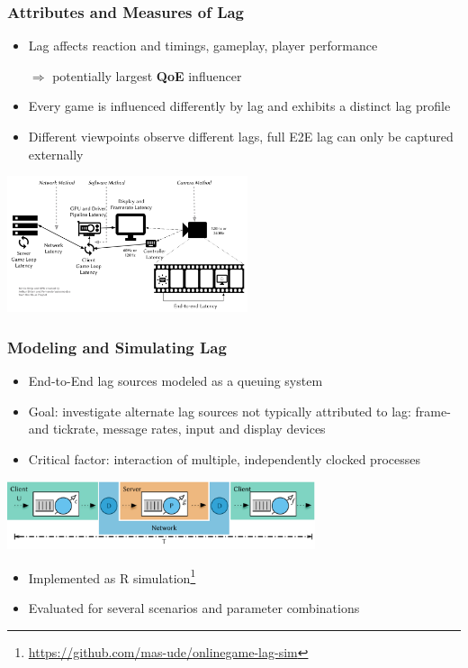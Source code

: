 \documentclass{UDEbeamerEN}
\begin{document}
\begin{frame}
	\frametitle{Attributes and Measures of Lag}

	\begin{itemize}
		\item Lag affects reaction and timings, gameplay, player performance 
		\item[$\Rightarrow$] potentially largest \textbf{QoE} influencer
		\item Every game is influenced differently by lag and exhibits a distinct lag profile
		\item Different viewpoints observe different lags, full E2E lag can only be captured externally
	\end{itemize}

	\begin{center}
		\vspace{-2mm}

		\includegraphics[height=4cm]{../../../models/e2e-lag.pdf}
	\end{center}

\end{frame}


\begin{frame}
	\frametitle{Modeling and Simulating Lag}

	\begin{itemize}
		\item End-to-End lag sources modeled as a queuing system
		\item Goal: investigate alternate lag sources not typically attributed to lag: frame- and tickrate, message rates, input and display devices
		\item Critical factor: interaction of multiple, independently clocked processes
	\end{itemize}

	\begin{center}
		\includegraphics[height=2cm]{../../../models/e2e-lag-model.pdf}
	\end{center}

	\begin{itemize}
		\item Implemented as R simulation\footnote[frame]{\url{https://github.com/mas-ude/onlinegame-lag-sim}}
		\item Evaluated for several scenarios and parameter combinations
	\end{itemize}

\end{frame}
\end{document}
